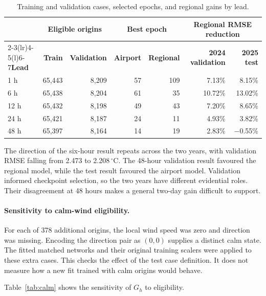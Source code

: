 \documentclass[11pt,letterpaper]{article}
\newcommand{\thead}[1]{\textbf{#1}}\newcommand{\bestscore}[1]{\textbf{#1}}
\newcommand{\celsius}{\ensuremath{^{\circ}\mathrm{C}}}\newcommand{\code}[1]{\texttt{\small #1}}
\begin{document}
\begin{table}[!htbp]
\centering\small
\caption{Training and validation cases, selected epochs, and regional gains by lead.}\label{tab:selection}
\renewcommand{\arraystretch}{1.14}\begin{tabular*}{.99\linewidth}{@{\extracolsep{\fill}}lrrrrrr@{}}\toprule
 & \multicolumn{2}{c}{\thead{Eligible origins}} & \multicolumn{2}{c}{\thead{Best epoch}} & \multicolumn{2}{c}{\thead{Regional RMSE reduction}}\\
\cmidrule(lr){2-3}\cmidrule(lr){4-5}\cmidrule(l){6-7}\thead{Lead}&\thead{Train}&\thead{Validation}&\thead{Airport}&\thead{Regional}&\thead{2024 validation}&\thead{2025 test}\\\midrule
1 h & 65,443 & 8,209 & 57 & 109 & 7.13\% & 8.15\% \\
6 h & 65,438 & 8,204 & 61 & 35 & 10.72\% & 13.02\% \\
12 h & 65,432 & 8,198 & 49 & 43 & 7.20\% & 8.65\% \\
24 h & 65,421 & 8,187 & 24 & 11 & 4.93\% & 3.82\% \\
48 h & 65,397 & 8,164 & 14 & 19 & 2.83\% & −0.55\% \\
\bottomrule\end{tabular*}
\end{table}


The direction of the six-hour result repeats across the two years, with validation RMSE falling from 2.473 to 2.208\,\celsius. The 48-hour validation result favoured the regional model, while the test result favoured the airport model. Validation informed checkpoint selection, so the two years have different evidential roles. Their disagreement at 48 hours makes a general two-day gain difficult to support.

\paragraph{Sensitivity to calm-wind eligibility.}
For each of 378 additional origins, the local wind speed was zero and direction was missing. Encoding the direction pair as $(0,0)$ supplies a distinct calm state. The fitted matched networks and their original training scalers were applied to these extra cases. This checks the effect of the test case definition. It does not measure how a new fit trained with calm origins would behave.

Table~\ref{tab:calm} shows the sensitivity of $G_h$ to eligibility.
\end{document}
